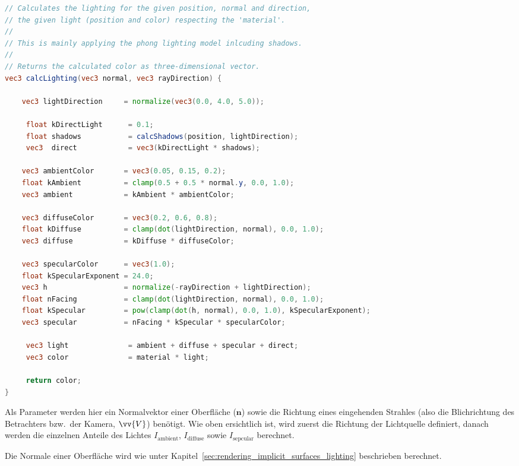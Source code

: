 \begin{lstlisting}[language=GLSL,caption={Umsetzung des Phong-Beleuchtungsmodelles in GLSL.},label={alg:glsl_lighting},captionpos=b,emph={calcLighting}]
// Calculates the lighting for the given position, normal and direction,
// the given light (position and color) respecting the 'material'.
//
// This is mainly applying the phong lighting model inlcuding shadows.
//
// Returns the calculated color as three-dimensional vector.
vec3 calcLighting(vec3 normal, vec3 rayDirection) {

    vec3 lightDirection     = normalize(vec3(0.0, 4.0, 5.0));

     float kDirectLight      = 0.1;
     float shadows           = calcShadows(position, lightDirection);
     vec3  direct            = vec3(kDirectLight * shadows);

    vec3 ambientColor       = vec3(0.05, 0.15, 0.2);
    float kAmbient          = clamp(0.5 + 0.5 * normal.y, 0.0, 1.0);
    vec3 ambient            = kAmbient * ambientColor;

    vec3 diffuseColor       = vec3(0.2, 0.6, 0.8);
    float kDiffuse          = clamp(dot(lightDirection, normal), 0.0, 1.0);
    vec3 diffuse            = kDiffuse * diffuseColor;

    vec3 specularColor      = vec3(1.0);
    float kSpecularExponent = 24.0;
    vec3 h                  = normalize(-rayDirection + lightDirection);
    float nFacing           = clamp(dot(lightDirection, normal), 0.0, 1.0);
    float kSpecular         = pow(clamp(dot(h, normal), 0.0, 1.0), kSpecularExponent);
    vec3 specular           = nFacing * kSpecular * specularColor;

     vec3 light              = ambient + diffuse + specular + direct;
     vec3 color              = material * light;
 
     return color;
}
\end{lstlisting}

Als Parameter werden hier ein Normalvektor einer Oberfläche ($\bm{n}$)
sowie die Richtung eines eingehenden Strahles (also die Blichrichtung
des Betrachters bzw.\ der Kamera, $\vv{V}$) benötigt.
Wie oben ersichtlich ist, wird zuerst die Richtung der Lichtquelle definiert,
danach werden die einzelnen Anteile des Lichtes $I_{\text{ambient}}$,
$I_{\text{diffuse}}$ sowie $I_{\text{sepcular}}$ berechnet.

Die Normale einer Oberfläche wird wie unter
Kapitel~\ref{sec:rendering_implicit_surfaces_lighting} beschrieben
berechnet.

